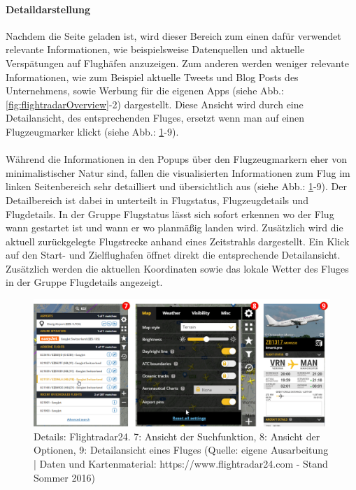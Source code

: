 \documentclass[../Bachelorarbeit.tex]{subfiles}
\begin{document}
\paragraph{Detaildarstellung}
\label{flightradarDetaildarstellung}
Nachdem die Seite geladen ist, wird dieser Bereich zum einen dafür verwendet  relevante Informationen, wie beispielsweise  Datenquellen und aktuelle Verspätungen auf Flughäfen anzuzeigen.
Zum anderen werden weniger relevante Informationen, wie zum Beispiel aktuelle Tweets und Blog Posts des Unternehmens, sowie Werbung für die eigenen Apps (siehe Abb.: \ref{fig:flightradarOverview}-2) dargestellt. 
Diese Ansicht wird durch eine Detailansicht, des entsprechenden Fluges, ersetzt wenn man auf einen Flugzeugmarker klickt (siehe Abb.: \ref{fig:flightradarDetail}-9).\\
\\
Während die Informationen in den Popups über den Flugzeugmarkern eher von minimalistischer Natur sind, fallen die visualisierten Informationen zum Flug im linken Seitenbereich sehr detailliert und übersichtlich aus (siehe Abb.: \ref{fig:flightradarDetail}-9). 
Der Detailbereich ist dabei in unterteilt in Flugstatus, Flugzeugdetails und Flugdetails.
In der Gruppe Flugstatus lässt sich sofort erkennen wo der Flug wann gestartet ist und wann er wo planmäßig landen wird. Zusätzlich wird die aktuell zurückgelegte Flugstrecke anhand eines Zeitstrahls dargestellt.
Ein Klick auf den Start- und Zielflughafen öffnet direkt die entsprechende Detailansicht.
Zusätzlich werden die aktuellen Koordinaten sowie das lokale Wetter des Fluges in der Gruppe Flugdetails angezeigt. 

\begin{figure}[H]
\centering
\includegraphics[width=1\linewidth]{img/StandDerTechnik/flightradarDetail}
\caption[Details: Flightradar24]{Details: Flightradar24. 7: Ansicht der Suchfunktion, 8: Ansicht der Optionen, 9: Detailansicht eines Fluges (Quelle: eigene Ausarbeitung | Daten und Kartenmaterial: https://www.flightradar24.com - Stand Sommer 2016)}
\label{fig:flightradarDetail}
\end{figure}
\end{document}
